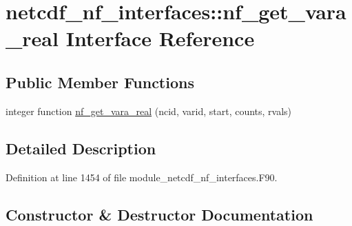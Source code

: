 \hypertarget{interfacenetcdf__nf__interfaces_1_1nf__get__vara__real}{}\section{netcdf\+\_\+nf\+\_\+interfaces\+:\+:nf\+\_\+get\+\_\+vara\+\_\+real Interface Reference}
\label{interfacenetcdf__nf__interfaces_1_1nf__get__vara__real}
\subsection*{Public Member Functions}
\begin{DoxyCompactItemize}
\item 
integer function \hyperlink{interfacenetcdf__nf__interfaces_1_1nf__get__vara__real_a86184191c6b2eed74181eafb7b9917f7}{nf\+\_\+get\+\_\+vara\+\_\+real} (ncid, varid, start, counts, rvals)
\end{DoxyCompactItemize}


\subsection{Detailed Description}


Definition at line 1454 of file module\+\_\+netcdf\+\_\+nf\+\_\+interfaces.\+F90.



\subsection{Constructor \& Destructor Documentation}
\mbox{\label{interfacenetcdf__nf__interfaces_1_1nf__get__vara__real_a86184191c6b2eed74181eafb7b9917f7}} 
